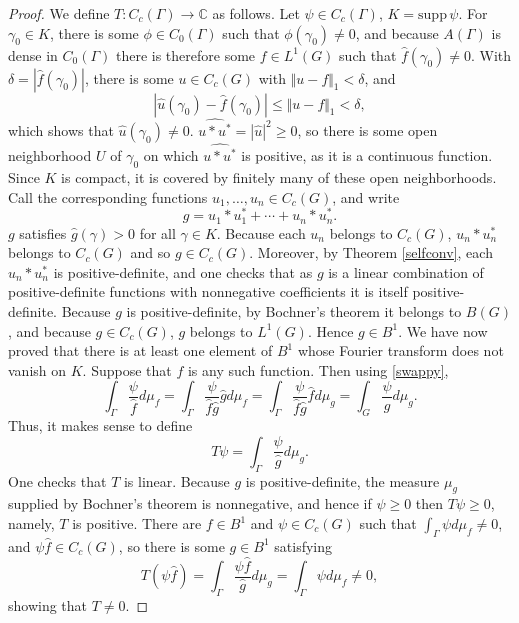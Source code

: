 \documentclass{article}
\newcommand{\supp}{\mathrm{supp}\,}
\newcommand{\norm}[1]{\Vert #1 \Vert}
\begin{document}
\begin{proof}
We define $T:C_c(\Gamma) \to \mathbb{C}$ as follows. Let $\psi \in C_c(\Gamma)$, $K=\supp \psi$. 
For $\gamma_0 \in K$, there is some $\phi \in C_0(\Gamma)$ such that $\phi(\gamma_0) \neq 0$, and because $A(\Gamma)$
is dense in $C_0(\Gamma)$ there is therefore some $f \in L^1(G)$ such that $\hat{f}(\gamma_0) \neq 0$. With
$\delta=|\hat{f}(\gamma_0)|$, there is some $u \in C_c(G)$ with $\norm{u-f}_1<\delta$, and 
\[
|\hat{u}(\gamma_0)-\hat{f}(\gamma_0)| \leq \norm{u-f}_1 < \delta,
\]
which shows that $\hat{u}(\gamma_0) \neq 0$. $\widehat{u*u^*}=|\hat{u}|^2 \geq 0$, so there is some open neighborhood
$U$ of $\gamma_0$ on which $\widehat{u*u^*}$ is positive, as it is a continuous function. Since $K$ is compact, it is covered
by finitely many of these open neighborhoods. Call the corresponding functions $u_1,\ldots,u_n \in C_c(G)$, and write
\[
g=u_1*u_1^* + \cdots + u_n*u_n^*.
\]
$g$ satisfies $\hat{g}(\gamma)>0$ for all $\gamma \in K$. Because each $u_n$ belongs to $C_c(G)$, 
$u_n*u_n^*$ belongs to $C_c(G)$ and so $g \in C_c(G)$. Moreover, by Theorem \ref{selfconv}, each $u_n*u_n^*$ is positive-definite,
and one checks that as $g$ is a linear combination of positive-definite functions with nonnegative coefficients it is itself
positive-definite. Because $g$ is positive-definite, by Bochner's theorem it belongs to $B(G)$, and because $g \in C_c(G)$, $g$
belongs to $L^1(G)$. Hence $g \in B^1$. 
We have now proved that there is at least one element of $B^1$ whose Fourier transform does not vanish on $K$. Suppose that
$f$ is any such function. Then using \eqref{swappy},
\[
\int_\Gamma \frac{\psi}{\hat{f}} d\mu_f = \int_\Gamma \frac{\psi}{\hat{f}\hat{g}} \hat{g} d\mu_f = 
\int_\Gamma \frac{\psi}{\hat{f} \hat{g}} \hat{f} d\mu_g = \int_G \frac{\psi}{\hat{g}} d \mu_g.
\]
Thus, it makes sense to define
\begin{equation}
T\psi = \int_\Gamma \frac{\psi}{\hat{g}} d\mu_g.
\label{Tpsi}
\end{equation}
One checks that $T$ is linear.
Because $g$ is positive-definite, the measure $\mu_g$ supplied by Bochner's theorem is nonnegative, and hence if
$\psi \geq 0$ then $T\psi \geq 0$, namely, $T$ is positive. There are $f \in B^1$ and $\psi \in C_c(G)$ such that
$\int_\Gamma \psi d\mu_f \neq 0$, and $\psi \hat{f} \in C_c(G)$, so there is some $g \in B^1$ satisfying 
\[
T(\psi \hat{f}) = \int_\Gamma \frac{\psi \hat{f}}{\hat{g}} d\mu_g = \int_\Gamma \psi d\mu_f \neq 0,
\]
showing that $T \neq 0$. 


\end{proof}
\end{document}
